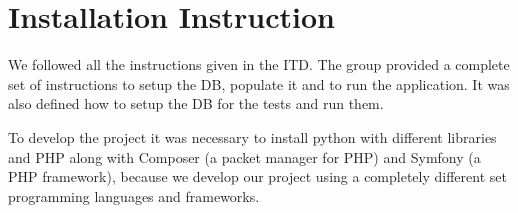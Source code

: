 \section{Installation Instruction}

We followed all the instructions given in the ITD.
The group provided a complete set of instructions to setup the DB, populate it and to run the application. It was also defined how to setup the DB for the tests and run them.

To develop the project it was necessary to install python with different libraries and PHP along with Composer (a packet manager for PHP) and Symfony (a PHP framework), because we develop our project using a completely different set programming languages and frameworks.
